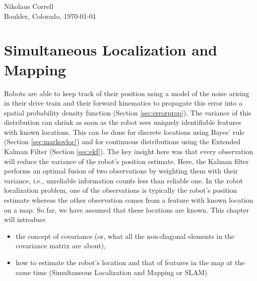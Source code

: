 \documentclass[paper=6.14in:9.21in,pagesize=pdftex,11pt,twoside,openright]{scrbook}
\begin{document}
\begin{flushright}
Nikolaus Correll\\
Boulder, Colorado, \today
\end{flushright}

% 
% 



% 
% 
% 
% 
% 
% 
% 
% 



\chapter{Simultaneous Localization and Mapping}\label{chap:slam}
Robots are able to keep track of their position using a model of the noise arising in their drive train and their forward kinematics to propagate this error into a spatial probability density function (Section \ref{sec:errorprop}). The variance of this distribution can shrink as soon as the robot sees uniquely identifiable features with known locations. This can be done for discrete locations using Bayes' rule (Section \ref{sec:markovloc}) and for continuous distributions using the Extended Kalman Filter (Section \ref{sec:ekf}). The key insight here was that every observation will reduce the variance of the robot's position estimate. Here, the Kalman filter performs an optimal fusion of two observations by weighting them with their variance, i.e., unreliable information counts less than reliable one. In the robot localization problem, one of the observations is typically the robot's position estimate whereas the other observation comes from a feature with known location on a map. So far, we have assumed that these locations are known. This chapter will introduce

\begin{itemize}
\item the concept of covariance (or, what all the non-diagonal elements in the covariance matrix are about),
\item how to estimate the robot's location and that of features in the map at the same time (Simultaneous Localization and Mapping or SLAM)
\end{itemize}
\end{document}
